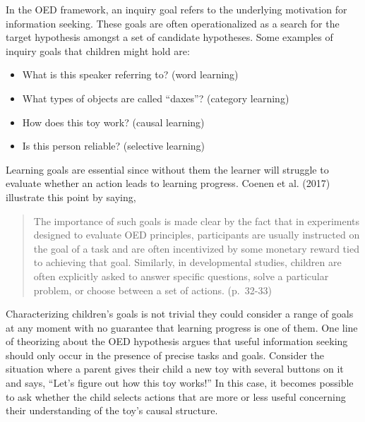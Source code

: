 \documentclass[oneside]{report}
\begin{document}
In the OED framework, an inquiry goal refers to the underlying
motivation for information seeking. These goals are often
operationalized as a search for the target hypothesis amongst a set of
candidate hypotheses. Some examples of inquiry goals that children might
hold are:
\begin{itemize}
\tightlist
\item
  What is this speaker referring to? (word learning)
\item
  What types of objects are called ``daxes''? (category learning)
\item
  How does this toy work? (causal learning)
\item
  Is this person reliable? (selective learning)
\end{itemize}
\noindent
Learning goals are essential since without them the learner will
struggle to evaluate whether an action leads to learning progress.
Coenen et al. (2017) illustrate this point by saying,
\begin{quote}
The importance of such goals is made clear by the fact that in
experiments designed to evaluate OED principles, participants are
usually instructed on the goal of a task and are often incentivized by
some monetary reward tied to achieving that goal. Similarly, in
developmental studies, children are often explicitly asked to answer
specific questions, solve a particular problem, or choose between a set
of actions. (p.~32-33)
\end{quote}
\noindent
Characterizing children's goals is not trivial they could consider a
range of goals at any moment with no guarantee that learning progress is
one of them. One line of theorizing about the OED hypothesis argues that
useful information seeking should only occur in the presence of precise
tasks and goals. Consider the situation where a parent gives their child
a new toy with several buttons on it and says, ``Let's figure out how
this toy works!'' In this case, it becomes possible to ask whether the
child selects actions that are more or less useful concerning their
understanding of the toy's causal structure.
\end{document}
